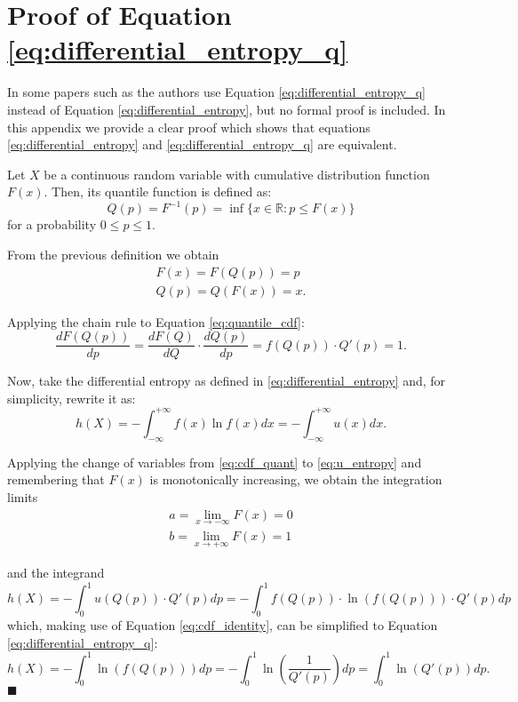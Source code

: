 \chapter{Proof of Equation \ref{eq:differential_entropy_q}}\label{entropy_proof}

In some papers such as \parencite{Vasicek} the authors use Equation \ref{eq:differential_entropy_q} instead of Equation \ref{eq:differential_entropy}, but no formal proof is included. In this appendix we provide a clear proof which shows that equations \ref{eq:differential_entropy} and \ref{eq:differential_entropy_q} are equivalent.

Let $X$ be a continuous random variable with cumulative distribution function $F(x)$. Then, its quantile function is defined as:
\begin{equation}
Q(p) = F^{-1}(p) = \inf\{x \in \mathbb{R} : p \leq F(x)\}
\end{equation}
for a probability $0 \leq p \leq 1$.

From the previous definition we obtain
\begin{align} 
F(x) = F(Q(p)) = p \label{eq:quantile_cdf} \\ 
Q(p) = Q(F(x)) = x \label{eq:cdf_quant}.
\end{align}

Applying the chain rule to Equation \ref{eq:quantile_cdf}:
\begin{equation}\label{eq:cdf_identity}
\frac{dF(Q(p))}{dp} = \frac{dF(Q)}{dQ} \cdot \frac{dQ(p)}{dp} = f(Q(p)) \cdot Q'(p) = 1.
\end{equation}

Now, take the differential entropy as defined in \ref{eq:differential_entropy} and, for simplicity, rewrite it as:
\begin{equation} \label{eq:u_entropy}
h(X) = - \int_{-\infty}^{+\infty} f(x) \ln f(x) dx = - \int_{-\infty}^{+\infty} u(x) dx.
\end{equation}

Applying the change of variables from \ref{eq:cdf_quant} to \ref{eq:u_entropy} and remembering that $F(x)$ is monotonically increasing, we obtain the integration limits
\begin{align}
a = \lim_{x \to -\infty} F(x) = 0\\
b = \lim_{x \to +\infty} F(x) = 1
\end{align}

and the integrand
\begin{equation}
h(X) = - \int_{0}^{1} u(Q(p)) \cdot Q'(p) dp = - \int_{0}^{1} f(Q(p)) \cdot \ln(f(Q(p))) \cdot Q'(p) dp
\end{equation}
which, making use of Equation \ref{eq:cdf_identity}, can be simplified to Equation \ref{eq:differential_entropy_q}:
\begin{equation}
h(X) = -  \int_{0}^{1} \ln\left(f(Q(p))\right) dp = - \int_{0}^{1} \ln\left(\frac{1}{Q'(p)}\right) dp = \int_{0}^{1} \ln\left(Q'(p)\right) dp.
\end{equation}
\hspace*{\fill}$\blacksquare$